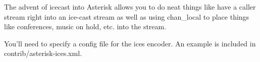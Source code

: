 The advent of icecast into Asterisk allows you to do neat things like have
a caller stream right into an ice-cast stream as well as using chan\_local
to place things like conferences, music on hold, etc. into the stream.

You'll need to specify a config file for the ices encoder.  An example is
included in contrib/asterisk-ices.xml.

